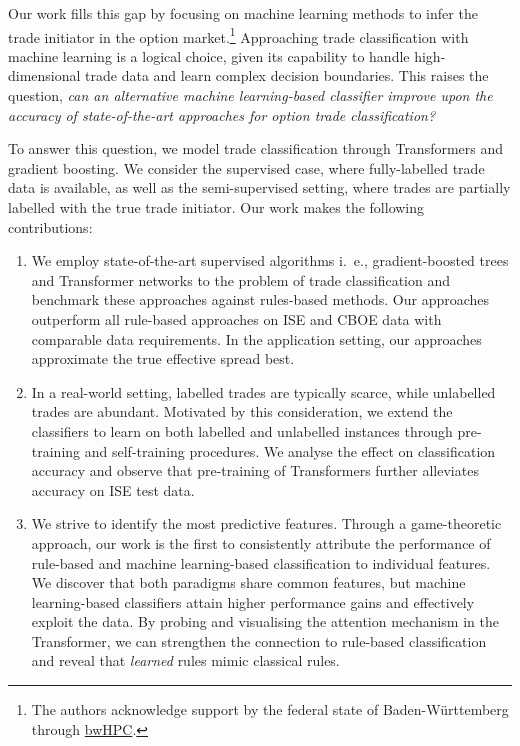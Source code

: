 Our work fills this gap by focusing on machine learning methods to infer the trade initiator in the option market.\footnote{The authors acknowledge support by the federal state of Baden-Württemberg through \href{https://www.bwhpc.de/}{bwHPC}.} Approaching trade classification with machine learning is a logical choice, given its capability to handle high-dimensional trade data and learn complex decision boundaries. This raises the question, \emph{can an alternative machine learning-based classifier improve upon the accuracy of state-of-the-art approaches for option trade classification?}

To answer this question, we model trade classification through Transformers and gradient boosting. We consider the supervised case, where fully-labelled trade data is available, as well as the semi-supervised setting, where trades are partially labelled with the true trade initiator. Our work makes the following contributions:
\begin{enumerate}
    \item We employ state-of-the-art supervised algorithms i.~e., gradient-boosted trees and Transformer networks to the problem of trade classification and benchmark these approaches against rules-based methods. Our approaches outperform all rule-based approaches on \gls{ISE} and \gls{CBOE} data with comparable data requirements. In the application setting, our approaches approximate the true effective spread best.
    \item In a real-world setting, labelled trades are typically scarce, while unlabelled trades are abundant. Motivated by this consideration, we extend the classifiers to learn on both labelled and unlabelled instances through pre-training and self-training procedures. We analyse the effect on classification accuracy and observe that pre-training of Transformers further alleviates accuracy on \gls{ISE} test data.
    \item We strive to identify the most predictive features. Through a game-theoretic approach, our work is the first to consistently attribute the performance of rule-based and machine learning-based classification to individual features. We discover that both paradigms share common features, but machine learning-based classifiers attain higher performance gains and effectively exploit the data. By probing and visualising the attention mechanism in the Transformer, we can strengthen the connection to rule-based classification and reveal that \emph{learned} rules mimic classical rules.
\end{enumerate}

